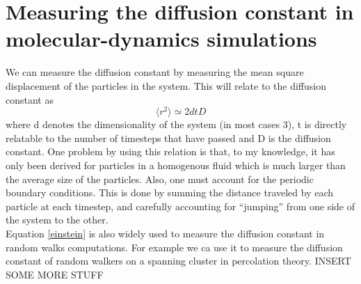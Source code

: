 \documentclass[a4paper,english, 10pt, twoside]{article}
\begin{document}
\section{Measuring the diffusion constant in molecular-dynamics simulations}\label{section_4}
We can measure the diffusion constant by measuring the mean square displacement of the particles in the system. 
This will relate to the diffusion constant as 
\begin{equation}\label{einstein}
 \langle r^2\rangle \simeq 2dtD
\end{equation}
where d denotes the dimensionality of the system (in most cases 3), t is directly relatable to the number of 
timesteps that have passed and D is the diffusion constant. One problem by using this relation is that, to 
my knowledge, it has only been derived for particles in a homogenous fluid which is much larger than the average 
size of the particles. Also, one must account for the periodic boundary conditions. This is done by summing the 
distance traveled by each particle at each timestep, and carefully accounting for ``jumping'' from one side of 
the system to the other.\\
Equation \ref{einstein} is also widely used to measure the diffusion constant in random walks computations. 
For example we ca use it to measure the diffusion constant of random walkers on a spanning cluster in percolation 
theory. INSERT SOME MORE STUFF
\end{document}
